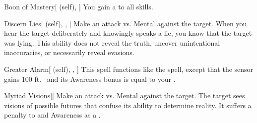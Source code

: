 \lowercase{\hypertarget{spell:Boon of Mastery}{}}\label{spell:Boon of Mastery}
\begin{attuneability}[\nth{2}]{\hypertarget{spell:Boon of Mastery}{Boon of Mastery}}[ (self), ]
You gain a   to all skills.
\end{attuneability}
\vspace{0.25em}



\lowercase{\hypertarget{spell:Discern Lies}{}}\label{spell:Discern Lies}
\begin{attuneability}[\nth{2}]{\hypertarget{spell:Discern Lies}{Discern Lies}}[ (self), , ]
Make an attack vs. Mental against the target.
\hit When you hear the target deliberately and knowingly speaks a lie, you know that the target was lying.
This ability does not reveal the truth, uncover unintentional inaccuracies, or necessarily reveal evasions.
\end{attuneability}
\vspace{0.25em}



\lowercase{\hypertarget{spell:Greater Alarm}{}}\label{spell:Greater Alarm}
\begin{attuneability}[\nth{2}]{\hypertarget{spell:Greater Alarm}{Greater Alarm}}[ (self), , ]
This spell functions like the  spell, except that the sensor gains 100 ft.\  and its Awareness bonus is equal to your .
\end{attuneability}
\vspace{0.25em}



\lowercase{\hypertarget{spell:Myriad Visions}{}}\label{spell:Myriad Visions}
\begin{freeability}[\nth{2}]{\hypertarget{spell:Myriad Visions}{Myriad Visions}}[]
Make an attack vs. Mental against the target.
\hit The target sees visions of possible futures that confuse its ability to determine reality.
It suffers a  penalty to  and Awareness as a .
\end{freeability}
\vspace{0.25em}



